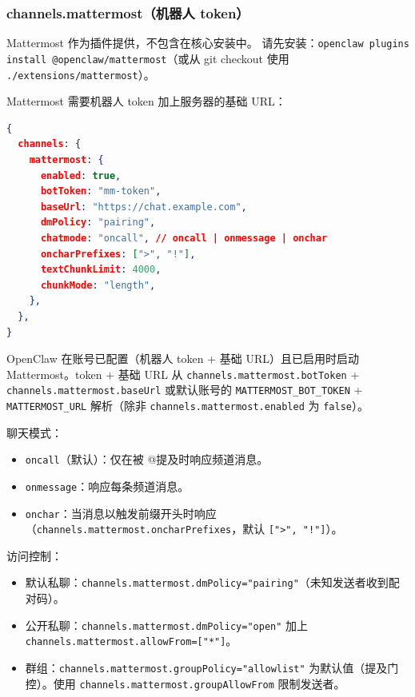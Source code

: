 \subsubsection{channels.mattermost（机器人 token）}


Mattermost 作为插件提供，不包含在核心安装中。
请先安装：\texttt{openclaw plugins install @openclaw/mattermost}（或从 git checkout 使用 \texttt{./extensions/mattermost}）。

Mattermost 需要机器人 token 加上服务器的基础 URL：

\begin{lstlisting}[language=json]
{
  channels: {
    mattermost: {
      enabled: true,
      botToken: "mm-token",
      baseUrl: "https://chat.example.com",
      dmPolicy: "pairing",
      chatmode: "oncall", // oncall | onmessage | onchar
      oncharPrefixes: [">", "!"],
      textChunkLimit: 4000,
      chunkMode: "length",
    },
  },
}
\end{lstlisting}


OpenClaw 在账号已配置（机器人 token + 基础 URL）且已启用时启动 Mattermost。token + 基础 URL 从 \texttt{channels.mattermost.botToken} + \texttt{channels.mattermost.baseUrl} 或默认账号的 \texttt{MATTERMOST\_BOT\_TOKEN} + \texttt{MATTERMOST\_URL} 解析（除非 \texttt{channels.mattermost.enabled} 为 \texttt{false}）。

聊天模式：

\begin{itemize}
  \item \texttt{oncall}（默认）：仅在被 @提及时响应频道消息。
  \item \texttt{onmessage}：响应每条频道消息。
  \item \texttt{onchar}：当消息以触发前缀开头时响应（\texttt{channels.mattermost.oncharPrefixes}，默认 \texttt{[">", "!"]}）。
\end{itemize}


访问控制：

\begin{itemize}
  \item 默认私聊：\texttt{channels.mattermost.dmPolicy="pairing"}（未知发送者收到配对码）。
  \item 公开私聊：\texttt{channels.mattermost.dmPolicy="open"} 加上 \texttt{channels.mattermost.allowFrom=["*"]}。
  \item 群组：\texttt{channels.mattermost.groupPolicy="allowlist"} 为默认值（提及门控）。使用 \texttt{channels.mattermost.groupAllowFrom} 限制发送者。
\end{itemize}


